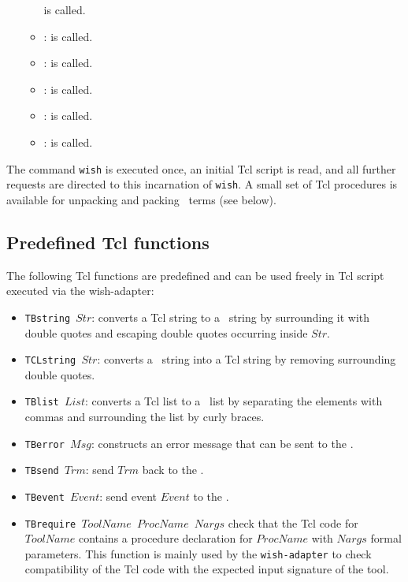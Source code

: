 \begin{itemize}
\begin{itemize}
     is
    called.
  \item {}:
     is
    called.
  \item {}:
     is
    called.
  \item {}:
     is called.
  \item {}:
     is called.
  \item {}:
     is called.
  \end{itemize}
\end{itemize}

\noindent The command {\tt wish} is executed once, an initial Tcl script
is read, and all further requests are directed to this incarnation
of {\tt wish}. A small set of Tcl procedures is available for
unpacking and packing \TB\ terms (see below).

\subsection{\label{Tcl-functions}Predefined Tcl functions}
The following Tcl functions are predefined and can be used freely in Tcl
script executed via the wish-adapter:
\begin{itemize}
\item {\tt TBstring $Str$\/}: converts a Tcl string to a \TB\ string by
surrounding it with double quotes and escaping double quotes occurring
inside $Str$.

\item {\tt TCLstring $Str$\/}: converts a \TB\ string into  a Tcl string
by removing surrounding double quotes.

\item {\tt TBlist $List$\/}: converts a Tcl list to a \TB\ list by
separating the elements with commas and surrounding the list by
curly braces.

\item {\tt TBerror $Msg$\/}: constructs an error message that can be sent
to the \TB.

\item {\tt TBsend $Trm$\/}: send $Trm$ back to the \TB.

\item {\tt TBevent $Event$\/}: send event $Event$ to the \TB.

\item {\tt TBrequire $ToolName$ $ProcName$ $Nargs$} check
that the Tcl code for $ToolName$ contains a procedure declaration
for $ProcName$ with $Nargs$ formal parameters.
This function is mainly used by the {\tt wish-adapter} to check
compatibility of the Tcl code with the expected input
signature of the tool.
\end{itemize}

